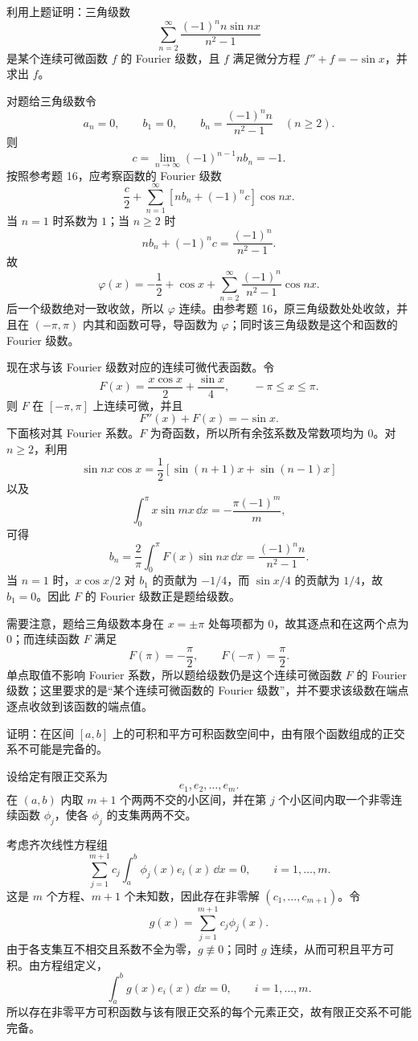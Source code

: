 \begin{xreferenceproblem}[17]
利用上题证明：三角级数
  \[
    \sum_{n=2}^{\infty}\frac{(-1)^n n\sin nx}{n^2-1}
  \]
  是某个连续可微函数 $f$ 的 Fourier 级数，且 $f$ 满足微分方程 $f''+f=-\sin x$，并求出 $f$。
\end{xreferenceproblem}
\begin{xsolution}
对题给三角级数令
\[
  a_n=0,
  \qquad b_1=0,
  \qquad b_n=\frac{(-1)^n n}{n^2-1}\quad(n\ge2).
\]
则
\[
  c=\lim_{n\to\infty}(-1)^{n-1}nb_n
  =-1.
\]
按照参考题 16，应考察函数的 Fourier 级数
\[
  \frac c2+
  \sum_{n=1}^{\infty}[nb_n+(-1)^nc]\cos nx.
\]
当 $n=1$ 时系数为 $1$；当 $n\ge2$ 时
\[
  nb_n+(-1)^nc
  =\frac{(-1)^n}{n^2-1}.
\]
故
\[
  \varphi(x)=-\frac12+\cos x+
  \sum_{n=2}^{\infty}\frac{(-1)^n}{n^2-1}\cos nx.
\]
后一个级数绝对一致收敛，所以 $\varphi$ 连续。由参考题 16，原三角级数处处收敛，并且在 $(-\pi,\pi)$ 内其和函数可导，导函数为 $\varphi$；同时该三角级数是这个和函数的 Fourier 级数。

现在求与该 Fourier 级数对应的连续可微代表函数。令
\[
  \boxed{\displaystyle
  F(x)=\frac{x\cos x}{2}+\frac{\sin x}{4},
  \qquad -\pi\le x\le\pi }.
\]
则 $F$ 在 $[-\pi,\pi]$ 上连续可微，并且
\[
  F''(x)+F(x)=-\sin x.
\]
下面核对其 Fourier 系数。$F$ 为奇函数，所以所有余弦系数及常数项均为 $0$。对 $n\ge2$，利用
\[
  \sin nx\cos x=\frac12[\sin(n+1)x+\sin(n-1)x]
\]
以及
\[
  \int_0^\pi x\sin mx\,\dd x=-\frac{\pi(-1)^m}{m},
\]
可得
\[
  b_n=\frac2\pi\int_0^\pi F(x)\sin nx\,\dd x
  =\frac{(-1)^n n}{n^2-1}.
\]
当 $n=1$ 时，$x\cos x/2$ 对 $b_1$ 的贡献为 $-1/4$，而 $\sin x/4$ 的贡献为 $1/4$，故 $b_1=0$。因此 $F$ 的 Fourier 级数正是题给级数。

需要注意，题给三角级数本身在 $x=\pm\pi$ 处每项都为 $0$，故其逐点和在这两个点为 $0$；而连续函数 $F$ 满足
\[
  F(\pi)=-\frac\pi2,\qquad F(-\pi)=\frac\pi2.
\]
单点取值不影响 Fourier 系数，所以题给级数仍是这个连续可微函数 $F$ 的 Fourier 级数；这里要求的是“某个连续可微函数的 Fourier 级数”，并不要求该级数在端点逐点收敛到该函数的端点值。
\end{xsolution}


\begin{xreferenceproblem}[18]
证明：在区间 $[a,b]$ 上的可积和平方可积函数空间中，由有限个函数组成的正交系不可能是完备的。
\end{xreferenceproblem}
\begin{xsolution}
设给定有限正交系为
\[
  e_1,e_2,\ldots,e_m.
\]
在 $(a,b)$ 内取 $m+1$ 个两两不交的小区间，并在第 $j$ 个小区间内取一个非零连续函数 $\phi_j$，使各 $\phi_j$ 的支集两两不交。

考虑齐次线性方程组
\[
  \sum_{j=1}^{m+1}c_j\int_a^b\phi_j(x)e_i(x)\,\dd x=0,
  \qquad i=1,\ldots,m.
\]
这是 $m$ 个方程、$m+1$ 个未知数，因此存在非零解
$(c_1,\ldots,c_{m+1})$。令
\[
  g(x)=\sum_{j=1}^{m+1}c_j\phi_j(x).
\]
由于各支集互不相交且系数不全为零，$g\not\equiv0$；同时 $g$ 连续，从而可积且平方可积。由方程组定义，
\[
  \int_a^bg(x)e_i(x)\,\dd x=0,
  \qquad i=1,\ldots,m.
\]
所以存在非零平方可积函数与该有限正交系的每个元素正交，故有限正交系不可能完备。
\end{xsolution}


